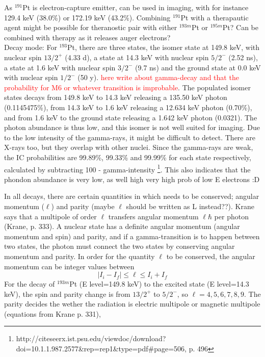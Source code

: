 \documentclass[a4paper,11pt,twoside]{book}
\begin{document}
\noindent 
As $^{191}$Pt is electron-capture emitter, can be used in imaging, with for instance 129.4 keV (38.0\%) or 172.19 keV (43.2\%). Combining $^{191}$Pt with a therapautic agent might be possible for theranostic pair with either $^{193m}$Pt or $^{195m}$Pt? Can be combined with therapy as it releases auger electrons? \\

\noindent
Decay mode: For $^{193}$Pt, there are three states, the isomer state at 149.8 keV, with nuclear spin $13/2^+$ (4.33 d), a state at 14.3 keV with nuclear spin $5/2^-$ (2.52 ns), a state at 1.6 keV with nuclear spin $3/2^-$ (9.7 ns) and the ground state at 0.0 keV with nuclear spin $1/2^-$ (50 y). \textcolor{red}{here write about gamma-decay and that the probability for M6 or whatever transition is improbable}. The populated isomer states decays from 149.8 keV to 14.3 keV releasing a 135.50 keV photon (0.1145475\%), from 14.3 keV to 1.6 keV releasing a 12.634 keV photon (0.70\%), and from 1.6 keV to the ground state releasing a 1.642 keV photon (0.0321). The photon abundance is thus low, and this isomer is not well suited for imaging. Due to the low intensity of the gamma-rays, it might be difficult to detect. There are X-rays too, but they overlap with other nuclei. Since the gamma-rays are weak, the IC probabilities are 99.89\%, 99.33\% and 99.99\% for each state respectively, calculated by subtracting 100 - gamma-intensity \footnote{http://citeseerx.ist.psu.edu/viewdoc/download?doi=10.1.1.987.2577&rep=rep1&type=pdf#page=506, p. 496}. This also indicates that the phondon abundance is very low, as well  high very high prob of low E electrons :D 

In all decays, there are certain quantities in which needs to be conserved; angular momentum ($\ell$) and parity (maybe $\ell$ should be written as L instead??). Krane says that a multipole of order $\ell$ transfers angular momentum $\ell\hbar$ per photon (Krane, p. 333). A nuclear state has a definite angular momentum (angular momentum and spin) and parity, and if a gamma-transition is to happen between two states, the photon must connect the two states by conserving angular momentum and parity. In order for the quantity $\ell$ to be conserved, the angular momentum can be integer values between
\begin{equation}
|I_i-I_f| \leq \ell \leq I_i + I_f
\end{equation}
For the decay of $^{193m}$Pt (E level=149.8 keV) to the excited state (E level=14.3 keV), the spin and parity change is from $13/2^+$ to $5/2^-$, so $\ell=4,5,6,7,8,9$. The parity decides the wether the radiation is electric multipole or magnetic multipole (equations from Krane p. 331), 
\end{document}
